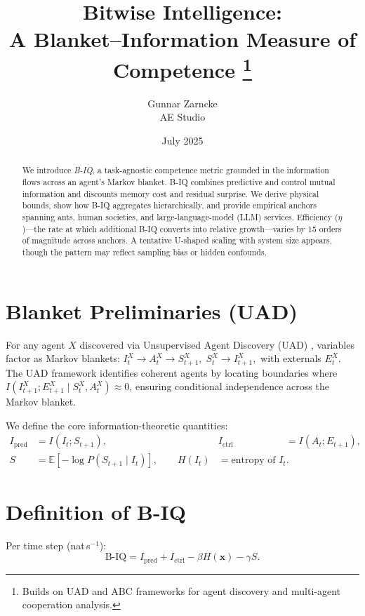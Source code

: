 \documentclass[10pt,conference]{IEEEtran}
\title{Bitwise Intelligence:\\A Blanket–Information Measure of Competence
\thanks{\hspace{1em}Builds on UAD \cite{uad2025} and ABC \cite{abc2025} frameworks for agent discovery and multi-agent cooperation analysis.}}
\author{Gunnar Zarncke\\
AE Studio}
\date{July 2025}
\newcommand{\hstate}{\mathbf x}        %
\newcommand{\precision}{\gamma}        %
\begin{document}
\maketitle

\begin{abstract}
We introduce \emph{B-IQ}, a task-agnostic competence metric grounded in the information flows across an agent's Markov blanket.  
B-IQ combines predictive and control mutual information and discounts memory cost and residual surprise.  
We derive physical bounds, show how B-IQ aggregates hierarchically, and provide empirical anchors spanning ants, human societies, and large-language-model (LLM) services.  
Efficiency (\(\eta\))—the rate at which additional B-IQ converts into relative growth—varies by 15 orders of magnitude across anchors.  
A tentative U-shaped scaling with system size appears, though the pattern may reflect sampling bias or hidden confounds.
\end{abstract}

\section{Blanket Preliminaries (UAD)}
For any agent \(X\) discovered via Unsupervised Agent Discovery (UAD) \cite{uad2025}, variables factor as Markov blankets:
\(
I^X_t\!\to\!A^X_t\!\to\!S^X_{t+1},
\;
S_t^X\!\to\!I^X_{t+1},
\)
with externals \(E^X_t\). The UAD framework identifies coherent agents by locating boundaries where \(I(I^X_{t+1};E^X_{t+1}\mid S^X_t,A^X_t) \approx 0\), ensuring conditional independence across the Markov blanket.

We define the core information-theoretic quantities:
\begin{align}
I_{\mathrm{pred}} &= I(I_t;S_{t+1}), &
I_{\mathrm{ctrl}} &= I(A_t;E_{t+1}),\nonumber\\
S &= \mathbb E[-\!\log P(S_{t+1}\!\mid I_t)],\qquad
H(I_t)&=\text{entropy of }I_t.
\end{align}

\section{Definition of B-IQ}
\label{sec:def}
Per time step (nat\,s\(^{-1}\)):
\begin{equation}
\boxed{
\text{B‑IQ}
= I_{\text{pred}}
+ I_{\text{ctrl}}
- \beta H(\hstate)
- \precision S.
}
\end{equation}
\end{document}
